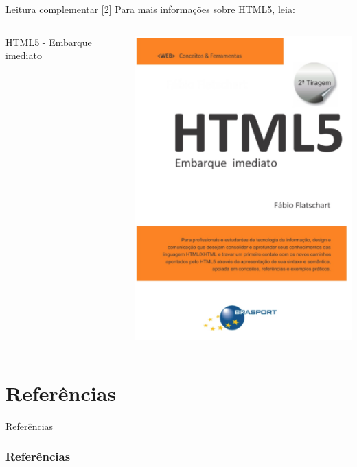 \documentclass{beamer}
\begin{document}
\begin{frame}{Leitura complementar [2]}
 Para mais informações sobre HTML5, leia:\\
 \begin{columns}
   \begin{column}{0.4\textwidth}
     HTML5 - Embarque imediato\\ 
      \cite{flatschart2011html}
   \end{column}
   \begin{column}{0.3\textwidth}
    \begin{center}
  \includegraphics[height=0.5\paperheight]{fig/aula2/flatschart2014html.png} \\
 \end{center}
   \end{column}
 \end{columns}
\end{frame}
\section{Referências}
\begin{frame}{Referências}%
\frametitle{Referências}
\small
\begin{center}
\tiny


\end{center}
\end{frame}
\end{document}
